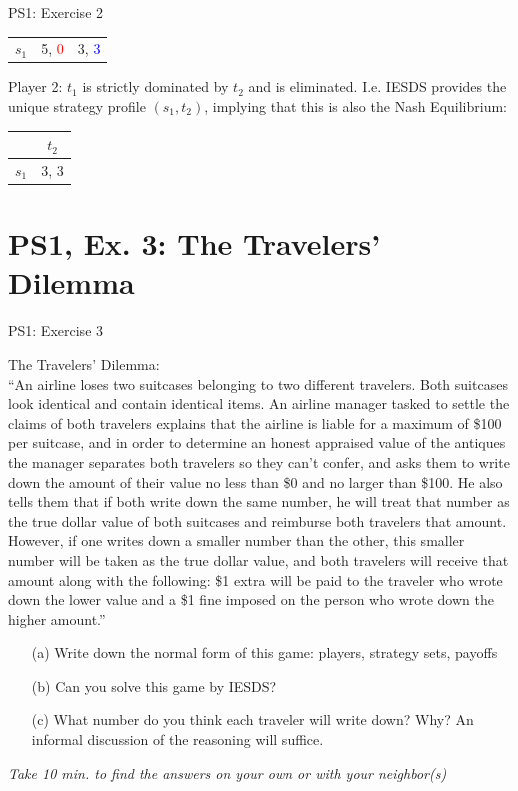 \begin{frame}{PS1: Exercise 2}
\begin{multicols}{2}
\begin{table}
\begin{tabular}{c|c|c}
    \midrule
    $s_1$ & 5, \textcolor{red}{0}  & 3, \textcolor{blue}{3}
  \end{tabular}
\end{table}
Player 2: $t_1$ is strictly dominated by $t_2$ and is eliminated. I.e. IESDS provides the unique strategy profile $(s_1,t_2)$, implying that this is also the Nash Equilibrium:
\begin{table}
  \begin{tabular}{c|c}
          & $t_2$ \\
    \midrule
    $s_1$ & 3, 3
  \end{tabular}
\end{table}
\vfill\null
\end{multicols}
\end{frame}


\section{PS1, Ex. 3: The Travelers' Dilemma}

\begin{frame}{PS1: Exercise 3}
\begin{multicols}{2}
  The Travelers' Dilemma:\\\smallskip
  “An airline loses two suitcases belonging to two different travelers. Both suitcases look identical and contain identical items. An airline manager tasked to settle the claims of both travelers explains that the airline is liable for a maximum of \$100 per suitcase, and in order to determine an honest appraised value of the antiques the manager separates both travelers so they can’t confer, and asks them to write down the amount of their value no less than \$0 and no larger than \$100. He also tells them that if both write down the same number, he will treat that number as the true dollar value of both suitcases and reimburse both travelers that amount.
\vfill\null
\columnbreak
However, if one writes down a smaller number than the other, this smaller number will be taken as the true dollar value, and both travelers will receive that amount along with the following: \$1 extra will be paid to the traveler who wrote down the lower value and a \$1 fine imposed on the person who wrote down the higher amount.”
\begin{itemize}
  \item[(a)] Write down the normal form of this game: players, strategy sets, payoffs
\item[(b)] Can you solve this game by IESDS?
\item[(c)] What number do you think each traveler will write down? Why? An informal
discussion of the reasoning will suffice.
\end{itemize}
\textit{Take 10 min. to find the answers on your own or with your neighbor(s)}
\vfill\null
\end{multicols}
\end{frame}

